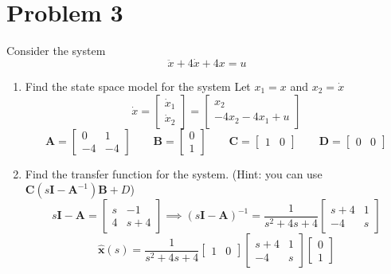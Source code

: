 \documentclass{article}
\begin{document}
\newpage
\section*{Problem 3}
Consider the system
$$ \ddot{x} + 4\dot{x} +4x=u $$
\begin{enumerate}[1)]
\item Find the state space model for the system
\newline
Let $x_1 = x$ and $x_2 = \dot{x}$
$$
\dot{x}
=
\begin{bmatrix}
\dot{x}_1\\
\dot{x}_2
\end{bmatrix}
=
\begin{bmatrix}
x_2 \\
-4x_2 - 4 x_1 + u
\end{bmatrix}
$$
$$
\mathbf{A}
=
\begin{bmatrix}
0 & 1 \\
-4 & -4
\end{bmatrix}
\qquad
\mathbf{B}
=
\begin{bmatrix}
0 \\
1
\end{bmatrix}
\qquad
\mathbf{C}
=
\begin{bmatrix}
1 & 0
\end{bmatrix}
\qquad
\mathbf{D}
=
\begin{bmatrix}
0 & 0
\end{bmatrix}
$$
\item Find the transfer function for the system. (Hint: you can use $\mathbf{C}(s\mathbf{I}-\mathbf{A}^{-1})\mathbf{B}+D$)
\newline
$$
s\mathbf{I}-\mathbf{A}
=
\begin{bmatrix}
s  & -1\\
4 & s+4
\end{bmatrix}
\implies
(s\mathbf{I}-\mathbf{A})^{-1}
=
\frac{1}{s^2 +4s +4}
\begin{bmatrix}
s+4 & 1\\
-4   & s
\end{bmatrix}
$$
$$
\mathbf{\hat{x}}(s)
=
\frac{1}{s^2 +4s +4}
\begin{bmatrix}
1 & 0
\end{bmatrix}
\begin{bmatrix}
s+4 & 1\\
-4   & s
\end{bmatrix}
\begin{bmatrix}
0\\
1
\end{bmatrix}
$$
\end{enumerate}
\end{document}
